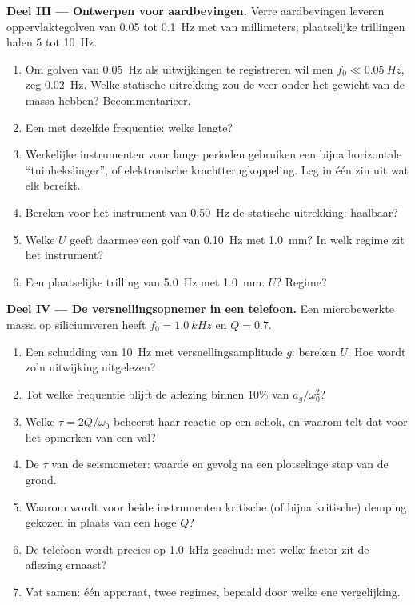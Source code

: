 \begin{problem}
\medskip
\noindent\textbf{Deel III --- Ontwerpen voor aardbevingen.}
Verre aardbevingen leveren oppervlaktegolven van \qty{0.05}{} tot \qty{0.1}{Hz}
met  van millimeters; plaatselijke trillingen halen \qty{5}{} tot \qty{10}{Hz}.
\begin{enumerate}[resume]
  \item Om golven van \qty{0.05}{Hz} als uitwijkingen te registreren wil men
        $f_0 \ll \qty{0.05}{Hz}$, zeg \qty{0.02}{Hz}. Welke statische
        uitrekking zou de veer onder het gewicht van de massa hebben? Becommentarieer.
  \item Een  met dezelfde frequentie: welke lengte?
  \item Werkelijke instrumenten voor lange perioden gebruiken een bijna horizontale
        ``tuinhekslinger'', of elektronische krachtterugkoppeling. Leg
        in één zin uit wat elk bereikt.
  \item Bereken voor het instrument van \qty{0.50}{Hz} de statische uitrekking:
        haalbaar?
  \item Welke $U$ geeft daarmee een golf van \qty{0.10}{Hz} met  \qty{1.0}{mm}?
        In welk regime zit het instrument?
  \item Een plaatselijke trilling van \qty{5.0}{Hz} met  \qty{1.0}{mm}: $U$?
        Regime?
\end{enumerate}

\medskip
\noindent\textbf{Deel IV --- De versnellingsopnemer in een telefoon.}
Een microbewerkte massa op siliciumveren heeft $f_0 = \qty{1.0}{kHz}$ en
$Q = 0.7$.
\begin{enumerate}[resume]
  \item Een schudding van \qty{10}{Hz} met versnellingsamplitude $g$: bereken
        $U$. Hoe wordt zo'n uitwijking uitgelezen?
  \item Tot welke frequentie blijft de aflezing binnen $10\%$ van $a_g/\omega_0^2$?
  \item Welke  $\tau = 2Q/\omega_0$ beheerst haar reactie op een
        schok, en waarom telt dat voor het opmerken van een val?
  \item De $\tau$ van de seismometer: waarde en gevolg na een plotselinge
        stap van de grond.
  \item Waarom wordt voor beide instrumenten kritische (of bijna kritische)
        demping gekozen in plaats van een hoge $Q$?
  \item De telefoon wordt precies op \qty{1.0}{kHz} geschud: met welke factor
        zit de aflezing ernaast?
  \item Vat samen: één apparaat, twee regimes, bepaald door welke ene
        vergelijking.
\end{enumerate}
\end{problem}
